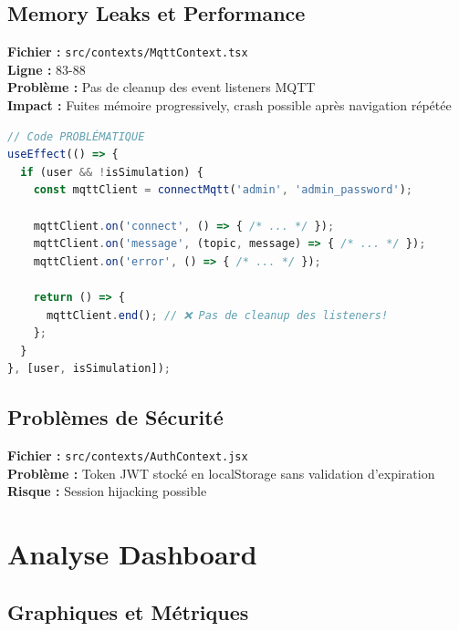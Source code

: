 \documentclass[a4paper,12pt]{article}
\begin{document}
\subsection{Memory Leaks et Performance}

\begin{tcolorbox}[colback=alertred!10, colframe=alertred, title={\faIcon{exclamation-triangle} Memory Leak Critique}]
\textbf{Fichier :} \texttt{src/contexts/MqttContext.tsx} \\
\textbf{Ligne :} 83-88 \\
\textbf{Problème :} Pas de cleanup des event listeners MQTT \\
\textbf{Impact :} Fuites mémoire progressively, crash possible après navigation répétée
\end{tcolorbox}

\begin{lstlisting}[language=TypeScript, caption=Code avec Memory Leak]
// Code PROBLÉMATIQUE
useEffect(() => {
  if (user && !isSimulation) {
    const mqttClient = connectMqtt('admin', 'admin_password');
    
    mqttClient.on('connect', () => { /* ... */ });
    mqttClient.on('message', (topic, message) => { /* ... */ });
    mqttClient.on('error', () => { /* ... */ });
    
    return () => {
      mqttClient.end(); // ❌ Pas de cleanup des listeners!
    };
  }
}, [user, isSimulation]);
\end{lstlisting}

\subsection{Problèmes de Sécurité}

\begin{tcolorbox}[colback=alertred!10, colframe=alertred, title={\faIcon{shield-alt} Vulnérabilité JWT}]
\textbf{Fichier :} \texttt{src/contexts/AuthContext.jsx} \\
\textbf{Problème :} Token JWT stocké en localStorage sans validation d'expiration \\
\textbf{Risque :} Session hijacking possible
\end{tcolorbox}

\section{Analyse Dashboard}

\subsection{Graphiques et Métriques}
\end{document}
